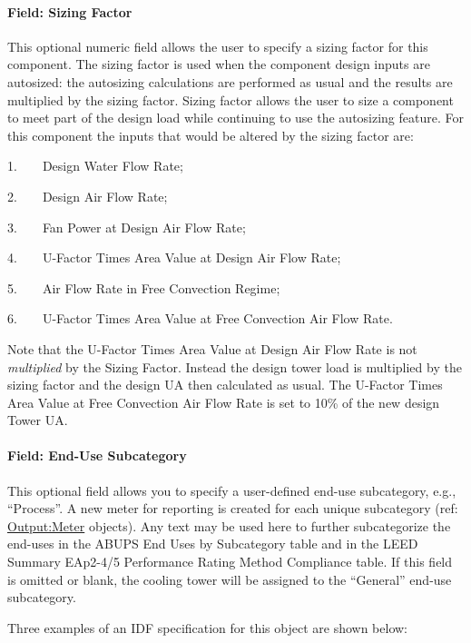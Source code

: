 \paragraph{Field: Sizing Factor}\label{sizing-factor-01}

This optional numeric field allows the user to specify a sizing factor for this component. The sizing factor is used when the component design inputs are autosized: the autosizing calculations are performed as usual and the results are multiplied by the sizing factor. Sizing factor allows the user to size a component to meet part of the design load while continuing to use the autosizing feature. For this component the inputs that would be altered by the sizing factor are:

1.~~~~Design Water Flow Rate;

2.~~~~Design Air Flow Rate;

3.~~~~Fan Power at Design Air Flow Rate;

4.~~~~U-Factor Times Area Value at Design Air Flow Rate;

5.~~~~Air Flow Rate in Free Convection Regime;

6.~~~~U-Factor Times Area Value at Free Convection Air Flow Rate.

Note that the U-Factor Times Area Value at Design Air Flow Rate is not \emph{multiplied} by the Sizing Factor. Instead the design tower load is multiplied by the sizing factor and the design UA then calculated as usual. The U-Factor Times Area Value at Free Convection Air Flow Rate is set to 10\% of the new design Tower UA.

\paragraph{Field: End-Use Subcategory}\label{end-use-subcategory-01}

This optional field allows you to specify a user-defined end-use subcategory, e.g., ``Process''. A new meter for reporting is created for each unique subcategory (ref: \hyperref[outputmeter-and-outputmetermeterfileonly]{Output:Meter} objects). Any text may be used here to further subcategorize the end-uses in the ABUPS End Uses by Subcategory table and in the LEED Summary EAp2-4/5 Performance Rating Method Compliance table. If this field is omitted or blank, the cooling tower will be assigned to the ``General'' end-use subcategory.


Three examples of an IDF specification for this object are shown below:

